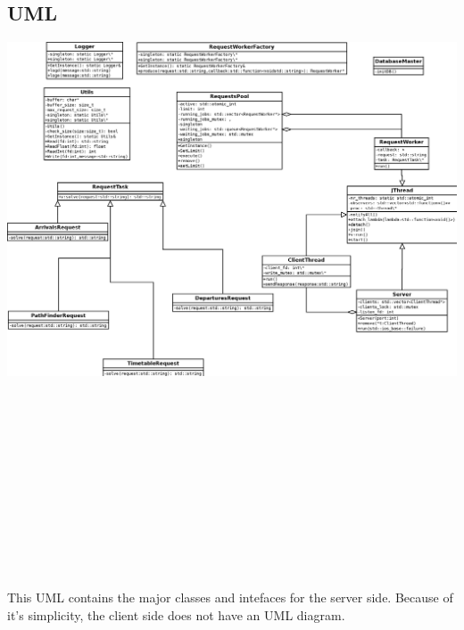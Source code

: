 \documentclass{llncs}
\begin{document}
		\subsection{UML}
		\includegraphics{output}
		\\
		\\
		\\
		\\
		\\
		\\
		\\
		\\
		\\
		\\
		\\
		\\
		\\
		This UML contains the major classes and intefaces for the server side. Because of it's simplicity, the client side does not have an UML diagram.
		\\
		\\
		\\
		\\
		\\
		\\
\end{document}
